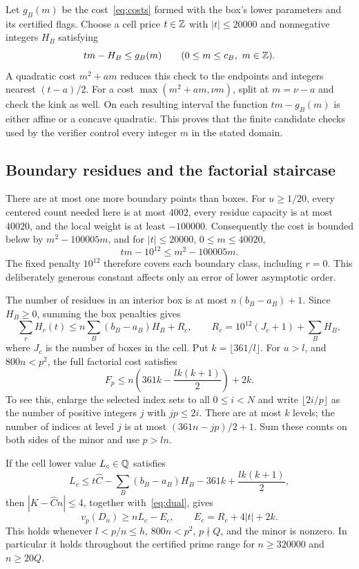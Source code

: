 Let $g_B(m)$ be the cost~\eqref{eq:costs} formed with the box's lower
parameters and its certified flags. Choose a cell price $t\in\mathbb Z$ with
$|t|\le20000$ and nonnegative integers $H_B$ satisfying
\begin{equation}\label{eq:box-dual}
 tm-H_B\le g_B(m)\qquad(0\le m\le c_B,\ m\in\mathbb Z).
\end{equation}
A quadratic cost $m^2+am$ reduces this check to the endpoints and integers
nearest $(t-a)/2$. For a cost $\max(m^2+am,\nu m)$, split at
$m=\nu-a$ and check the kink as well. On each resulting interval the
function $tm-g_B(m)$ is either affine or a concave quadratic. This proves
that the finite candidate checks used by the verifier control every
integer $m$ in the stated domain.

\subsection{Boundary residues and the factorial staircase}
There are at most one more boundary points than boxes. For $u\ge1/20$,
every centered count needed here is at most $4002$, every residue capacity
is at most $40020$, and the local weight is at least $-100000$.
Consequently the cost is bounded below by $m^2-100005m$, and for
$|t|\le20000$, $0\le m\le40020$,
\[
 tm-10^{12}\le m^2-100005m.
\]
The fixed penalty $10^{12}$ therefore covers each boundary class, including
$r=0$. This deliberately generous constant affects only an error of lower
asymptotic order.

The number of residues in an interior box is at most
$n(b_B-a_B)+1$. Since $H_B\ge0$, summing the box penalties gives
\[
 \sum_r H_r(t)\le n\sum_B(b_B-a_B)H_B+R_c,\qquad
 R_c=10^{12}(J_c+1)+\sum_BH_B,
\]
where $J_c$ is the number of boxes in the cell. Put $k=\lfloor361/l\rfloor$.
For $u>l$, and $800n<p^2$, the full factorial cost satisfies
\begin{equation}\label{eq:factorial-cost}
 F_p\le n\left(361k-\frac{lk(k+1)}2\right)+2k.
\end{equation}
To see this, enlarge the selected index sets to all $0\le i<N$ and
write $\lfloor2i/p\rfloor$ as the number of positive integers $j$ with
$jp\le2i$. There are at most $k$ levels; the number of indices at level
$j$ is at most $(361n-jp)/2+1$. Sum these counts on both sides of the
minor and use $p>ln$.

If the cell lower value $L_c\in\mathbb Q$ satisfies
\begin{equation}\label{eq:cell-lower}
 L_c\le t\widehat C-\sum_B(b_B-a_B)H_B
                   -361k+\frac{lk(k+1)}2,
\end{equation}
then $|K-\widehat Cn|\le4$, together with~\eqref{eq:dual}, gives
\begin{equation}\label{eq:cell-valuation}
 v_p(D_n)\ge nL_c-E_c,\qquad E_c=R_c+4|t|+2k.
\end{equation}
This holds whenever $l<p/n\le h$, $800n<p^2$, $p\nmid Q$, and the
minor is nonzero. In particular it holds throughout the certified prime
range for $n\ge320000$ and $n\ge20Q$.

